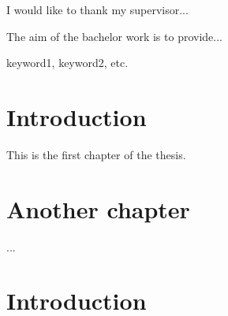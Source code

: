 \documentclass[12pt,oneside,draft]{fithesis2}
\begin{document}
\FrontMatter
\ThesisTitlePage

\begin{ThesisDeclaration}
\DeclarationText
\AdvisorName
\end{ThesisDeclaration}

\begin{ThesisThanks}
I would like to thank my supervisor...
\end{ThesisThanks}

\begin{ThesisAbstract}
The aim of the bachelor work is to provide...
\end{ThesisAbstract}

\begin{ThesisKeyWords}
keyword1, keyword2, etc.
\end{ThesisKeyWords}

\MainMatter
\chapter{Introduction}
This is the first chapter of the thesis.

\chapter{Another chapter}
...

\tableofcontents          %

\chapter{Introduction}    %

\end{document}
